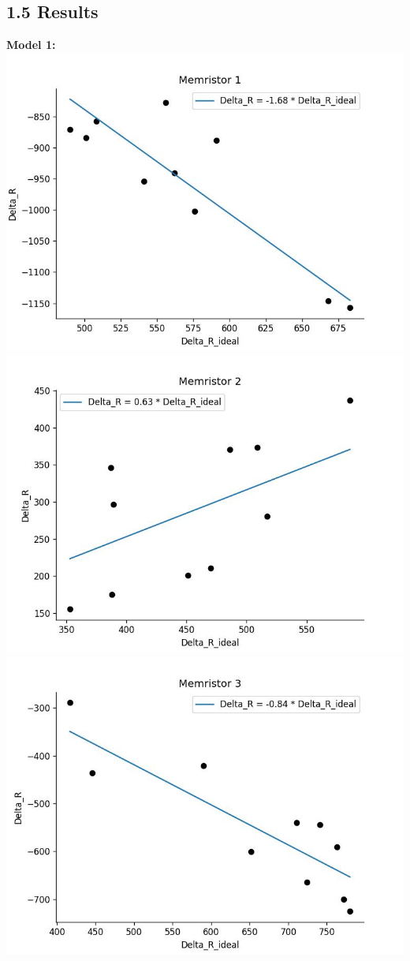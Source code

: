     \subsection*{1.5 Results}
    \textbf{Model 1:} \\
    \includegraphics[width=\textwidth / 2]{code/plots/model_1_memristor_1}
    \includegraphics[width=\textwidth / 2]{code/plots/model_1_memristor_2}
    \includegraphics[width=\textwidth / 2]{code/plots/model_1_memristor_3}
